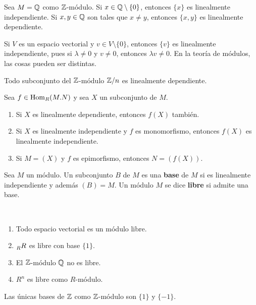 \begin{example}
Sea $M=\mathbb{Q}$ como $\mathbb{Z}$-módulo. Si $x\in\mathbb{Q}\setminus\{0\}$, entonces $\{x\}$ es linealmente independiente. Si $x,y\in\mathbb{Q}$ son tales
que $x\ne y$, entonces $\{x,y\}$ es linealmente dependiente. 	
\end{example}

Si $V$ es un espacio vectorial y $v\in V\setminus\{0\}$, entonces $\{v\}$ es linealmente independiente, pues
si $\lambda\ne0$ y $v\ne 0$, entonces $\lambda v\ne 0$. 
En la teoría de módulos, las cosas pueden ser distintas. 

\begin{example}
Todo subconjunto del $\mathbb{Z}$-módulo $\mathbb{Z}/n$ es linealmente dependiente. 
\end{example}

\begin{exercise}
Sea $f\in\operatorname{Hom}_R(M.N)$ y sea $X$ un subconjunto de $M$. 
\begin{enumerate}
\item Si $X$ es linealmente dependiente, entonces $f(X)$ también.
\item Si $X$ es linealmente independiente y $f$ es monomorfismo, entonces $f(X)$ es linealmente independiente.
\item Si $M=(X)$ y $f$ es epimorfismo, entonces $N=(f(X))$. 	
\end{enumerate}
\end{exercise}

\begin{definition}
	Sea $M$ un módulo. Un subconjunto $B$ de $M$ es una \textbf{base} de $M$ si 
	es linealmente independiente y además $(B)=M$. Un módulo $M$ se dice \textbf{libre} si 
	admite una base.  
\end{definition}

\begin{examples}\
\begin{enumerate}
	\item Todo espacio vectorial es un módulo libre.
	\item $\prescript{}{R}R$ es libre con base $\{1\}$. 
	\item El $\mathbb{Z}$-módulo $\mathbb{Q}$ no es libre.  
	\item $R^n$ es libre como $R$-módulo.
\end{enumerate}	
\end{examples}

\begin{example}
Las únicas bases de $\mathbb{Z}$ como $\mathbb{Z}$-módulo son $\{1\}$ y $\{-1\}$.	
\end{example}

